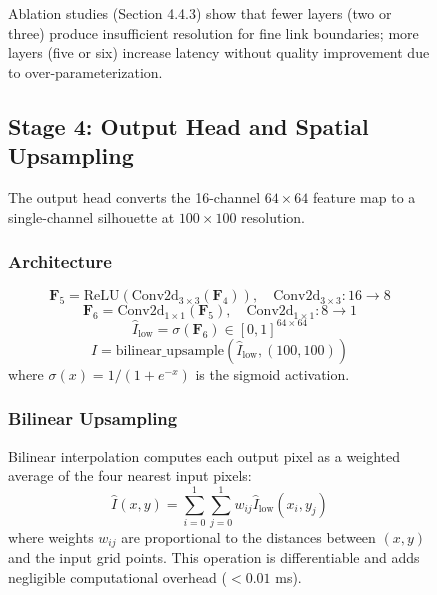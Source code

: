 \documentclass[12pt,a4paper,oneside]{report}
\begin{document}
\begin{figure}[H]
Ablation studies (Section 4.4.3) show that fewer layers (two or three) produce insufficient resolution for fine link boundaries; more layers (five or six) increase latency without quality improvement due to over-parameterization.

\subsection{Stage 4: Output Head and Spatial Upsampling}

The output head converts the 16-channel $64 \times 64$ feature map to a single-channel silhouette at $100 \times 100$ resolution.

\subsubsection{Architecture}

\begin{equation}
\mathbf{F}_5 = \text{ReLU}(\text{Conv2d}_{3\times3}(\mathbf{F}_4)), \quad \text{Conv2d}_{3\times3}: 16 \rightarrow 8
\end{equation}
\begin{equation}
\mathbf{F}_6 = \text{Conv2d}_{1\times1}(\mathbf{F}_5), \quad \text{Conv2d}_{1\times1}: 8 \rightarrow 1
\end{equation}
\begin{equation}
\hat{I}_{\text{low}} = \sigma(\mathbf{F}_6) \in [0, 1]^{64 \times 64}
\end{equation}
\begin{equation}
\hat{I} = \text{bilinear\_upsample}(\hat{I}_{\text{low}}, (100, 100))
\end{equation}
where $\sigma(x) = 1/(1 + e^{-x})$ is the sigmoid activation.

\subsubsection{Bilinear Upsampling}

Bilinear interpolation computes each output pixel as a weighted average of the four nearest input pixels:
\begin{equation}
\hat{I}(x,y) = \sum_{i=0}^{1}\sum_{j=0}^{1} w_{ij} \hat{I}_{\text{low}}(x_i, y_j)
\end{equation}
where weights $w_{ij}$ are proportional to the distances between $(x,y)$ and the input grid points. This operation is differentiable and adds negligible computational overhead ($<0.01$ ms).


\end{figure}
\end{document}
